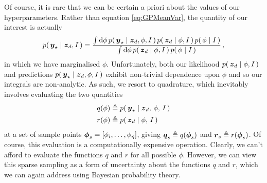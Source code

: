 \documentclass{acmtrans2m}
\begin{document}
\noindent Of course, it is rare that we can be certain a priori about the values of our hyperparameters. Rather than equation \eqref{eq:GPMeanVar}, the quantity of our interest is actually
\begin{equation} \label{eq:Marginalising}
 p\!\left(\,\boldsymbol{y}_\star\mid\boldsymbol{z}_d,I\,\right)=\frac{\int\mathrm{d}\phi\, p\!\left(\,\boldsymbol{y}_\star\mid\boldsymbol{z}_d,\phi,I\,\right)p\!\left(\,\boldsymbol{z}_d\mid\phi,I\,\right)p\!\left(\,\phi\mid I\,\right)}
{\int\mathrm{d}\phi\, p\!\left(\,\boldsymbol{z}_d\mid\phi,I\,\right)p\!\left(\,\phi\mid I\,\right)}\,,
\end{equation}
in which we have marginalised $\phi$. Unfortunately, both our likelihood $p\!\left(\,\boldsymbol{z}_d\mid\phi,I\,\right)$ and predictions $p\!\left(\,\boldsymbol{y}_\star\mid\boldsymbol{z}_d,\phi,I\,\right)$ exhibit non-trivial dependence upon $\phi$ and so our integrals are non-analytic. As such, we resort to quadrature, which inevitably involves evaluating the two quantities
\begin{equation}
\begin{split}
q(\phi)& \triangleq p\!\left(\,\boldsymbol{y}_\star\mid\boldsymbol{z}_d,\,\phi,\,I\,\right) \\
r(\phi)& \triangleq p\!\left(\,\boldsymbol{z}_d\mid\phi,\,I\,\right)
\end{split}
\end{equation}
at a set of sample points $\boldsymbol{\phi}_s=[\phi_i,\ldots,\phi_\eta]$, giving $\boldsymbol{q}_s\triangleq q(\boldsymbol{\phi}_s)$ and $\boldsymbol{r}_s\triangleq r(\boldsymbol{\phi}_s)$. Of course, this evaluation is a computationally expensive operation. Clearly, we can't afford to evaluate the functions $q$ and $r$ for all possible $\phi$. However, we can view this sparse sampling as a form of uncertainty about the functions $q$ and $r$, which we can again address using Bayesian probability theory. 
\end{document}
